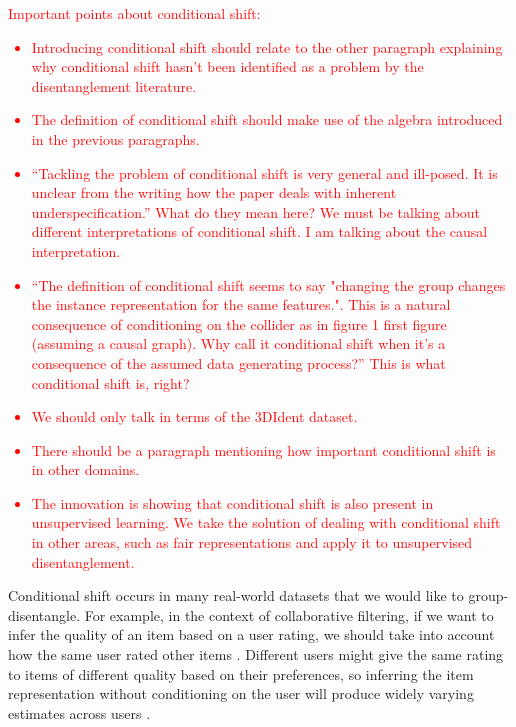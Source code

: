 \documentclass{article} %
\newcommand{\todo}[1]{\textcolor{red}{#1}}
\begin{document}
\todo{Important points about conditional shift: 
\begin{itemize}
    \item Introducing conditional shift should relate to the other paragraph explaining why conditional shift hasn't been identified as a problem by the disentanglement literature.
    \item The definition of conditional shift should make use of the algebra introduced in the previous paragraphs.
    \item ``Tackling the problem of conditional shift is very general and ill-posed. It is unclear from the writing how the paper deals with inherent underspecification.'' What do they mean here? We must be talking about different interpretations of conditional shift. I am talking about the causal interpretation.
    \item ``The definition of conditional shift seems to say "changing the group changes the instance representation for the same features.". This is a natural consequence of conditioning on the collider as in figure 1 first figure (assuming a causal graph). Why call it conditional shift when it's a consequence of the assumed data generating process?'' This is what conditional shift is, right?
    \item We should only talk in terms of the 3DIdent dataset.
    \item There should be a paragraph mentioning how important conditional shift is in other domains.
    \item The innovation is showing that conditional shift is also present in unsupervised learning. We take the solution of dealing with conditional shift in other areas, such as fair representations and apply it to unsupervised disentanglement.
\end{itemize}}

Conditional shift occurs in many real-world datasets that we would like to group-disentangle. For example, in the context of collaborative filtering, if we want to infer the quality of an item based on a user rating, we should take into account how the same user rated other items \citep{Koren2009MatrixFT}. Different users might give the same rating to items of different quality based on their preferences, so inferring the item representation without conditioning on the user will produce widely varying estimates across users \citep{Pinheiro2001MixedEffectsMI}.
\end{document}
